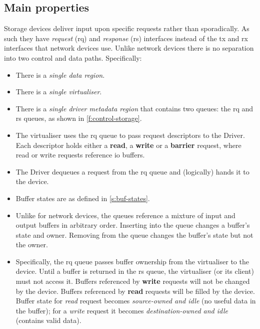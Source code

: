 \documentclass[a4paper,12pt]{report}
\begin{document}
\subsection{Main properties}\label{s:cl-storage-props}

Storage devices deliver input upon specific requests rather than
sporadically. As such they have \emph{request} (\gls{rq}) and
\emph{response} (\gls{rs})
interfaces instead of the \gls{tx} and \gls{rx} interfaces that network devices
use. Unlike network devices there is no separation into two control
and data paths. Specifically:
\begin{itemize}
\item There is a \emph{single data region}.
\item There is a \emph{single virtualiser}.
\item  There is a \emph{single driver metadata region} that contains two queues: the \gls{rq} and
  \gls{rs} queues, as shown in \autoref{f:control-storage}.
\item The virtualiser uses the \gls{rq} queue to pass request descriptors to the
  Driver. Each descriptor holds either a \textbf{read}, a
  \textbf{write} or a \textbf{barrier} request, where read or write
  requests reference \gls{io} buffers.
\item The Driver dequeues a request from the \gls{rq} queue and (logically)
  hands it to the device.
\item Buffer states are as defined in
  \autoref{s:buf-states}.
\item Unlike for network devices, the queues reference a mixture of input
  and output buffers in arbitrary order. Inserting into the queue
  changes a buffer's state and owner. Removing from the queue changes
  the buffer's state but not the owner.
\item Specifically, the \gls{rq} queue passes buffer ownership from the
  virtualiser to the device. Until a buffer is returned in the \gls{rs} queue,
  the virtualiser (or its client) must not access it.  Buffers referenced by \textbf{write}
  requests will not be changed by the device.  Buffers referenced by
  \textbf{read} requests will be filled by the device.
  Buffer state for \emph{read} request becomes \emph{source-owned and idle} (no
  useful data in the buffer); for a \emph{write} request it becomes \emph{destination-owned
  and idle} (contains valid data).


\end{itemize}
\end{document}
